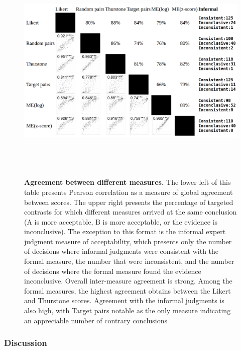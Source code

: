 \documentclass[doc]{apa6}
\newcommand{\targchoice}{{\sc Target pairs}}
\newcommand{\thurstone}{{\sc Thurstone}}
\newcommand{\likert}{{\sc Likert}}
\begin{document}
\begin{figure}[t]
\centering
\begin{adjustwidth}{-1.5cm}{}
\includegraphics[height=11cm,keepaspectratio]{figures/scoreAgreement.png}
\caption{{\small {\bf Agreement between different measures.}
The lower left of this table presents Pearson correlation as a measure of global agreement between scores. The upper right presents the percentage of targeted contrasts for which different measures arrived at the same conclusion (A is more acceptable, B is more acceptable, or the evidence is inconclusive). The exception to this format is the informal expert judgment measure of acceptability, which presents only the number of decisions where informal judgments were consistent with the formal measure, the number that were inconsistent, and the number of decisions where the formal measure found the evidence inconclusive. Overall inter-measure agreement is strong. Among the formal measures, the highest agreement obtains between the \likert{} and \thurstone{} scores. Agreement with the informal judgments is also high, with \targchoice{} notable as the only measure indicating an appreciable number of contrary conclusions
}}
\label{scoreagreement}
\end{adjustwidth}
\end{figure}


\subsubsection{Discussion}
\end{document}

